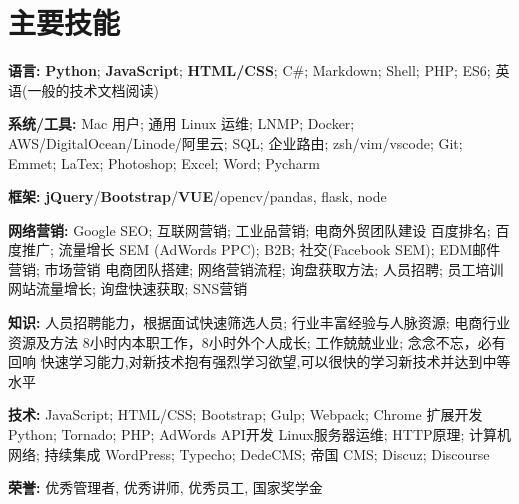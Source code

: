 \section{\textbf{主要技能}}
\resumeSubHeadingListStart
\item{
  \textbf{语言:}{ \textbf{Python}; \textbf{JavaScript}; \textbf{HTML/CSS}; C\#; Markdown; Shell; PHP; ES6; 英语(一般的技术文档阅读)}
}
\item{
 \textbf{系统/工具:}{ Mac 用户; 通用 Linux 运维; LNMP; Docker; AWS/DigitalOcean/Linode/阿里云; SQL; 企业路由; zsh/vim/vscode; Git; Emmet; LaTex; Photoshop; Excel; Word; Pycharm}
}
\item{
 \textbf{框架:}{ \textbf{jQuery}/\textbf{Bootstrap}/\textbf{VUE}/opencv/pandas, flask, node}
}
\item{
  \textbf{网络营销:}{
    \resumeItemListStart
       {Google SEO; 互联网营销; 工业品营销; 电商外贸团队建设 }
       {百度排名; 百度推广; 流量增长}
       {SEM (AdWords PPC); B2B; 社交(Facebook SEM); EDM邮件营销; 市场营销 }
       {电商团队搭建; 网络营销流程; 询盘获取方法; 人员招聘; 员工培训 }
       {网站流量增长; 询盘快速获取; SNS营销}
   \resumeItemListEnd
  }
}
\item{
  \textbf{知识:}{
    \resumeItemListStart
       {人员招聘能力，根据面试快速筛选人员; 行业丰富经验与人脉资源; 电商行业资源及方法}
       {8小时内本职工作，8小时外个人成长; 工作兢兢业业; 念念不忘，必有回响}
       {快速学习能力,对新技术抱有强烈学习欲望,可以很快的学习新技术并达到中等水平}
   \resumeItemListEnd
  }
}
\item{
  \textbf{技术:}{
    \resumeItemListStart
       {JavaScript; HTML/CSS; Bootstrap; Gulp; Webpack; Chrome 扩展开发}
       {Python; Tornado; PHP; AdWords API开发}
       {Linux服务器运维; HTTP原理; 计算机网络; 持续集成}
       {WordPress; Typecho; DedeCMS; 帝国 CMS; Discuz; Discourse}
   \resumeItemListEnd
  }
}
\item{
 \textbf{荣誉:}{
  优秀管理者, 优秀讲师, 优秀员工, 国家奖学金
 }
}
\resumeSubHeadingListEnd
